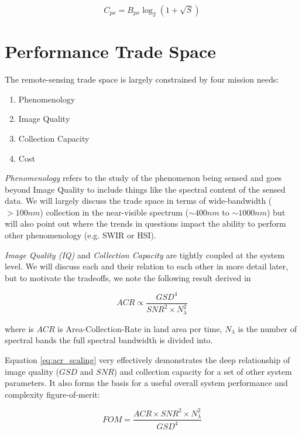 \documentclass[10pt,journal]{IEEEtran}  %
\begin{document}
\begin{equation}
    C_{px} = B_{px}\log_2 \left(1 + \sqrt{S}\right)
\end{equation}

\section{Performance Trade Space}
\label{sec:trade_space}

The remote-sensing trade space is largely constrained by four mission needs:

\begin{enumerate}
\item Phenomenology
\item Image Quality
\item Collection Capacity
\item Cost
\end{enumerate}

\emph{Phenomenology} refers to the study of the phenomenon being sensed and goes beyond Image Quality to include things like the spectral content of the sensed data.  We will largely discuss the trade space in terms of wide-bandwidth ($>100nm$) collection in the near-visible spectrum ($\sim 400nm$ to $\sim 1000nm$) but will also point out where the trends in questions impact the ability to perform other phenomenology (e.g. SWIR or HSI).

\emph{Image Quality (IQ)} and \emph{Collection Capacity} are tightly coupled at the system level.  We will discuss each and their relation to each other in more detail later, but to motivate the tradeoffs, we note the following result derived in \cite{shaw}

\begin{equation}
    \label{eq:acr_scaling}
    ACR \propto \frac{GSD^4}{SNR^2 \times N_{\lambda}^2}
\end{equation}

where is $ACR$ is Area-Collection-Rate in land area per time, $N_{\lambda}$ is the number of spectral bands the full spectral bandwidth is divided into.  

Equation \ref{eq:acr_scaling} very effectively demonstrates the deep relationship of image quality ($GSD$ and $SNR$) and collection capacity for a set of other system parameters.  It also forms the basis for a useful overall system performance and complexity figure-of-merit:

\begin{equation}
    \label{eq:perf_complex_metric}
    FOM = \frac{ACR \times SNR^2 \times N_{\lambda}^2}{GSD^4}
\end{equation}
\end{document}

